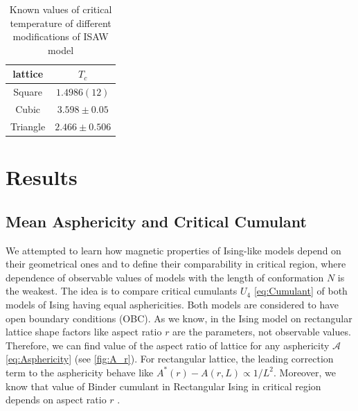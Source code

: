 \documentclass[aps,pre,amssymb,amsmath,twocolumn,floatfix]{revtex4-2}
\begin{document}
\begin{table}[h]
    \centering
    \begin{tabular}{|c|c|}
        \hline
        lattice & $T_{c}$ \\ \hline
        Square & $1.4986(12)$ \cite{Caracciolo2011} \\ \hline
        Cubic & $3.598 \pm 0.05 $\cite{Tesi1996} \\ \hline
        Triangle & $2.466 \pm 0.506 $\cite{Privman1986} \\ \hline
    \end{tabular}
    \caption{Known values of critical temperature of different modifications of ISAW model}
    \label{tab:ISAW_T_c}
\end{table}



\section{Results}

\subsection{Mean Asphericity and Critical Cumulant}


We attempted to learn how magnetic properties of Ising-like models depend on their geometrical ones and to define their comparability in critical region, where dependence of observable values of models with the length of conformation $N$ is the weakest. The idea is to compare critical cumulants $U_{4}$ \eqref{eq:Cumulant} of both models of Ising having equal asphericities. Both models are considered to have open boundary conditions (OBC). As we know, in the Ising model on rectangular lattice shape factors like aspect ratio $r$ are the parameters, not observable values. Therefore, we can find value of the aspect ratio of lattice for any asphericity $\mathcal{A}$ \eqref{eq:Asphericity} (see \cref{fig:A_r}). For rectangular lattice, the leading correction term to the asphericity behave like $A^{*}(r) - A(r, L) \propto 1 / L^{2}$. Moreover, we know that value of Binder cumulant in Rectangular Ising in critical region depends on aspect ratio $r$ \cite{Selke2006}. 
\end{document}
